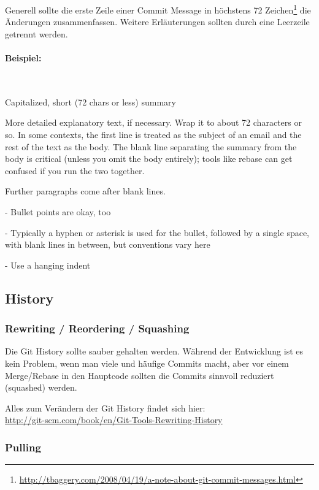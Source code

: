 \noindent Generell sollte die erste Zeile einer Commit Message in höchstens 72
Zeichen\footnote{\url{http://tbaggery.com/2008/04/19/a-note-about-git-commit-messages.html}}
die Änderungen zusammenfassen. Weitere Erläuterungen sollten durch eine
Leerzeile getrennt werden.

\paragraph{Beispiel:} ~\\

\begin{textcode}
Capitalized, short (72 chars or less) summary

More detailed explanatory text, if necessary.  Wrap it to about 72
characters or so.  In some contexts, the first line is treated as the
subject of an email and the rest of the text as the body. The blank
line separating the summary from the body is critical (unless you omit
the body entirely); tools like rebase can get confused if you run the
two together.

Further paragraphs come after blank lines.

- Bullet points are okay, too

- Typically a hyphen or asterisk is used for the bullet, followed by a
  single space, with blank lines in between, but conventions vary here

- Use a hanging indent
\end{textcode}

\subsection{History}

\subsubsection{Rewriting / Reordering / Squashing}

Die Git History sollte sauber gehalten werden. Während der Entwicklung ist es
kein Problem, wenn man viele und häufige Commits macht, aber vor einem
Merge/Rebase in den Hauptcode sollten die Commits sinnvoll reduziert (squashed)
werden. 

Alles zum Verändern der Git History findet sich hier:\\
\url{http://git-scm.com/book/en/Git-Tools-Rewriting-History}

\subsubsection{Pulling}

